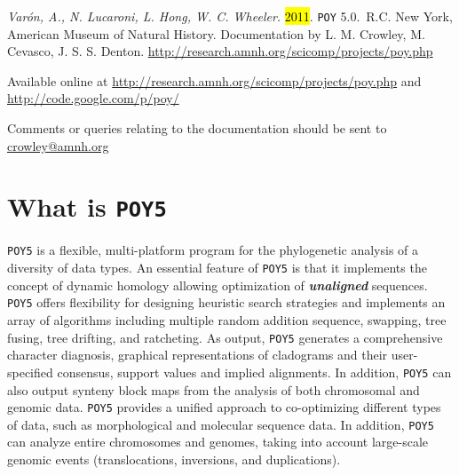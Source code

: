 \documentclass[11pt]{book}
\newcommand{\commandstyle}[1]{\texttt{#1}}
\newcommand{\poy}{\commandstyle{POY5}\xspace}
\begin{document}
\begin{flushleft}
\vspace*{0.25cm}
\emph{Var\'on, A., N. Lucaroni, L. Hong, W. C. Wheeler.} \hl{2011}. \texttt{POY} 5.0.\buildnumber\ R.C. New York, 
American Museum of Natural History. Documentation by L. M. Crowley, M. Cevasco, J. S. S. Denton. 
\url{http://research.amnh.org/scicomp/projects/poy.php}

\vspace*{0.25cm}

Available online at
\url{http://research.amnh.org/scicomp/projects/poy.php}
and
\url{http://code.google.com/p/poy/} 

Comments or queries relating to the documentation should be sent to \href{mailto:crowley@amnh.org}{crowley@amnh.org}
\end{flushleft}

\tableofcontents


\chapter{What is \poy}

\poy is a flexible, multi-platform program for the phylogenetic analysis of a diversity of data types. %
An essential feature of \poy is that it implements the concept of dynamic homology \cite{wheeler2001a, wheeler2001} allowing 
optimization of   {\bf \emph{unaligned}} sequences. \poy offers flexibility for designing heuristic search strategies and implements an array of 
algorithms including multiple random addition sequence, swapping, tree fusing, tree drifting, and ratcheting. As output, \poy 
generates a comprehensive character diagnosis, graphical representations of cladograms and their user-specified consensus, 
support values and implied alignments.  In addition, \poy can also output synteny block maps from the analysis of both 
chromosomal and genomic data. \poy provides a unified approach to co-optimizing different types of data, such as morphological 
and molecular sequence data. In addition, \poy can analyze entire chromosomes and genomes, taking into account large-scale 
genomic events (translocations, inversions, and duplications).
\end{document}
